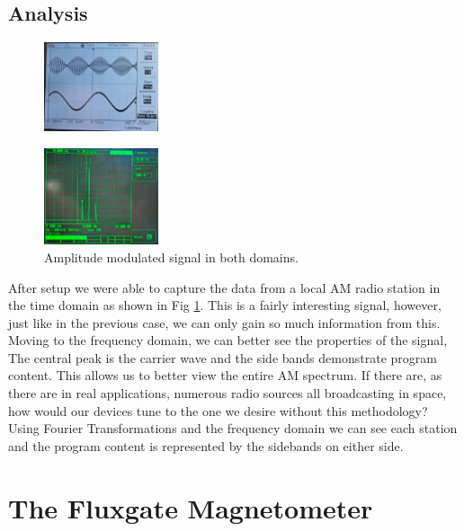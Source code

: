 \documentclass[prl,twocolumn,superscriptaddress,floatfix]{revtex4}
\begin{document}
\subsection{Analysis}
\begin{figure}[H]
\begin{center}
\includegraphics[width = 0.3\textwidth]{AM data, Time.jpg}
\end{center}
\end{figure}
\begin{figure}[H]
\begin{center}
\includegraphics[width = 0.3\textwidth]{AM data, Freq.jpg}
\caption{\label{amfreq}Amplitude modulated signal in both domains.}
\end{center}
\end{figure}
After setup we were able to capture the data from a local AM radio station in the time domain as shown in Fig \ref{amfreq}. This is a fairly interesting signal, however, just like in the previous case, we can only gain so much information from this.
Moving to the frequency domain, we can better see the properties of the signal, The central peak is the carrier wave and the side bands demonstrate program content.
This allows us to better view the entire AM spectrum. If there are, as there are in real applications, numerous radio sources all broadcasting in space, how would our devices tune to the one we desire without this methodology?
Using Fourier Transformations and the frequency domain we can see each station and the program content is represented by the sidebands on either side. 

\section{The Fluxgate Magnetometer}
\end{document}

